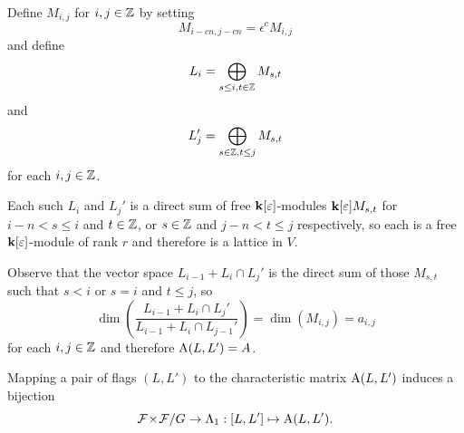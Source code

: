\documentclass[a4paper, 11pt, twoside]{report}
\begin{document}
Define $M_{i,j}$ for $i,j\in\mathbb{Z}$ by setting
\begin{equation*}
M_{i-cn,j-cn} = \epsilon^c M_{i,j}
\end{equation*}
and define
\begin{equation*}
L_i = \bigoplus_{s\le i, t\in\mathbb{Z}} M_{s,t}
\end{equation*}
and
\begin{equation*}
L_j' = \bigoplus_{s\in\mathbb{Z}, t\le j} M_{s,t}
\end{equation*}
for each $i,j\in\mathbb{Z}$.

Each such $L_i$ and $L_j'$ is a direct sum of free $\mathbf{k}[\varepsilon]$-modules $\mathbf{k}[\varepsilon]M_{s,t}$ for $i-n<s\le i$ and $t\in\mathbb{Z}$, or $s\in\mathbb{Z}$ and $j-n<t\le j$ respectively, so each is a free $\mathbf{k}[\varepsilon]$-module of rank $r$ and therefore is a lattice in $V$.

Observe that the vector space $L_{i-1}+L_i\cap L_j'$ is the direct sum of those $M_{s,t}$ such that $s<i$ or $s=i$ and $t\le j$, so
\begin{equation*}
\dim\left(\frac{L_{i-1} + L_i\cap L_j'}{L_{i-1} + L_i\cap L_{j-1}'}\right) = \dim\left(M_{i,j}\right) = a_{i,j}
\end{equation*}
for each $i,j\in\mathbb{Z}$ and therefore $\operatorname{A}(L,L')=A$.

\begin{lemma}
Mapping a pair of flags $(L,L')$ to the characteristic matrix $\operatorname{A}(L,L')$ induces a bijection
\begin{equation*}
{\mathcal{F}\!\times\!\mathcal{F}}/{G}\to\Lambda_1{}: [L,L']\mapsto \operatorname{A}(L,L').
\end{equation*}
\end{lemma}
\end{document}
